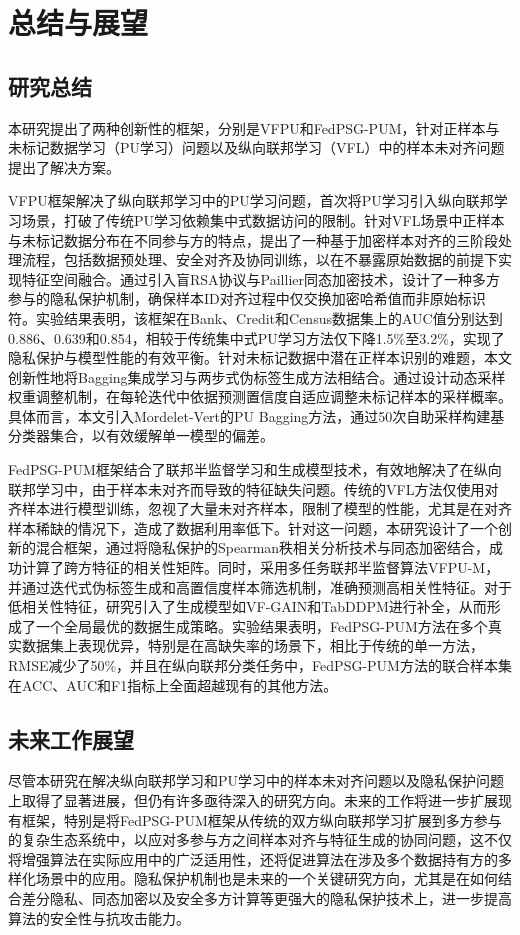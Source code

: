 \chapter{总结与展望}
\thispagestyle{others}
\pagestyle{others}
\xiaosi

\section{研究总结}
本研究提出了两种创新性的框架，分别是VFPU和FedPSG-PUM，针对正样本与未标记数据学习（PU学习）问题以及纵向联邦学习（VFL）中的样本未对齐问题提出了解决方案。

VFPU框架解决了纵向联邦学习中的PU学习问题，首次将PU学习引入纵向联邦学习场景，打破了传统PU学习依赖集中式数据访问的限制。针对VFL场景中正样本与未标记数据分布在不同参与方的特点，提出了一种基于加密样本对齐的三阶段处理流程，包括数据预处理、安全对齐及协同训练，以在不暴露原始数据的前提下实现特征空间融合。通过引入盲RSA协议与Paillier同态加密技术，设计了一种多方参与的隐私保护机制，确保样本ID对齐过程中仅交换加密哈希值而非原始标识符。实验结果表明，该框架在Bank、Credit和Census数据集上的AUC值分别达到0.886、0.639和0.854，相较于传统集中式PU学习方法仅下降1.5\%至3.2\%，实现了隐私保护与模型性能的有效平衡。针对未标记数据中潜在正样本识别的难题，本文创新性地将Bagging集成学习与两步式伪标签生成方法相结合。通过设计动态采样权重调整机制，在每轮迭代中依据预测置信度自适应调整未标记样本的采样概率。具体而言，本文引入Mordelet-Vert的PU Bagging方法，通过50次自助采样构建基分类器集合，以有效缓解单一模型的偏差。

FedPSG-PUM框架结合了联邦半监督学习和生成模型技术，有效地解决了在纵向联邦学习中，由于样本未对齐而导致的特征缺失问题。传统的VFL方法仅使用对齐样本进行模型训练，忽视了大量未对齐样本，限制了模型的性能，尤其是在对齐样本稀缺的情况下，造成了数据利用率低下。针对这一问题，本研究设计了一个创新的混合框架，通过将隐私保护的Spearman秩相关分析技术与同态加密结合，成功计算了跨方特征的相关性矩阵。同时，采用多任务联邦半监督算法VFPU-M，并通过迭代式伪标签生成和高置信度样本筛选机制，准确预测高相关性特征。对于低相关性特征，研究引入了生成模型如VF-GAIN和TabDDPM进行补全，从而形成了一个全局最优的数据生成策略。实验结果表明，FedPSG-PUM方法在多个真实数据集上表现优异，特别是在高缺失率的场景下，相比于传统的单一方法，RMSE减少了50\%，并且在纵向联邦分类任务中，FedPSG-PUM方法的联合样本集在ACC、AUC和F1指标上全面超越现有的其他方法。

\section{未来工作展望}
尽管本研究在解决纵向联邦学习和PU学习中的样本未对齐问题以及隐私保护问题上取得了显著进展，但仍有许多亟待深入的研究方向。未来的工作将进一步扩展现有框架，特别是将FedPSG-PUM框架从传统的双方纵向联邦学习扩展到多方参与的复杂生态系统中，以应对多参与方之间样本对齐与特征生成的协同问题，这不仅将增强算法在实际应用中的广泛适用性，还将促进算法在涉及多个数据持有方的多样化场景中的应用。隐私保护机制也是未来的一个关键研究方向，尤其是在如何结合差分隐私、同态加密以及安全多方计算等更强大的隐私保护技术上，进一步提高算法的安全性与抗攻击能力。

